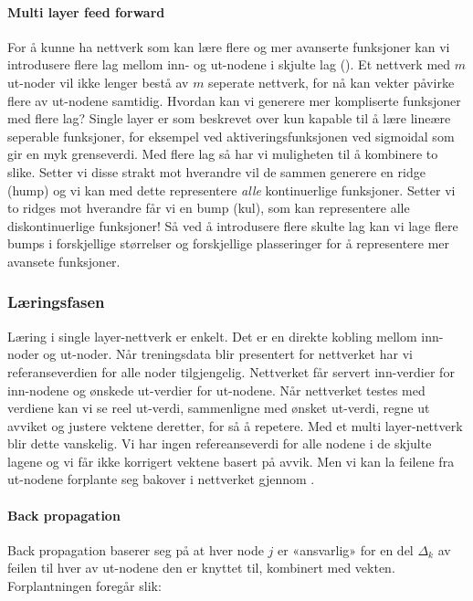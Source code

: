 \paragraph{Multi layer feed forward} For å kunne ha nettverk som kan lære flere og mer avanserte funksjoner kan vi introdusere flere lag mellom inn- og ut-nodene i skjulte lag (). Et nettverk med $m$ ut-noder vil ikke lenger bestå av $m$ seperate nettverk, for nå kan vekter påvirke flere av ut-nodene samtidig. Hvordan kan vi generere mer kompliserte funksjoner med flere lag? Single layer er som beskrevet over kun kapable til å lære lineære seperable funksjoner, for eksempel ved aktiveringsfunksjonen ved sigmoidal som gir en myk grenseverdi. Med flere lag så har vi muligheten til å kombinere to slike. Setter vi disse strakt mot hverandre vil de sammen generere en ridge (hump) og vi kan med dette representere \textit{alle} kontinuerlige funksjoner. Setter vi to ridges mot hverandre får vi en bump (kul), som kan representere alle diskontinuerlige funksjoner! Så ved å introdusere flere skulte lag kan vi lage flere bumps i forskjellige størrelser og forskjellige plasseringer for å representere mer avansete funksjoner. 

\subsubsection{Læringsfasen}

Læring i single layer-nettverk er enkelt. Det er en direkte kobling mellom inn-noder og ut-noder. Når treningsdata blir presentert for nettverket har vi referanseverdien for alle noder tilgjengelig. Nettverket får servert inn-verdier for inn-nodene og ønskede ut-verdier for ut-nodene. Når nettverket testes med verdiene kan vi se reel ut-verdi, sammenligne med ønsket ut-verdi, regne ut avviket og justere vektene deretter, for så å repetere. Med et multi layer-nettverk blir dette vanskelig. Vi har ingen refereanseverdi for alle nodene i de skjulte lagene og vi får ikke korrigert vektene basert på avvik. Men vi kan la feilene fra ut-nodene forplante seg bakover i nettverket gjennom . 

\paragraph{Back propagation} Back propagation baserer seg på at hver node $j$ er «ansvarlig» for en del $\Delta_k$ av feilen til hver av ut-nodene den er knyttet til, kombinert med vekten. Forplantningen foregår slik:

